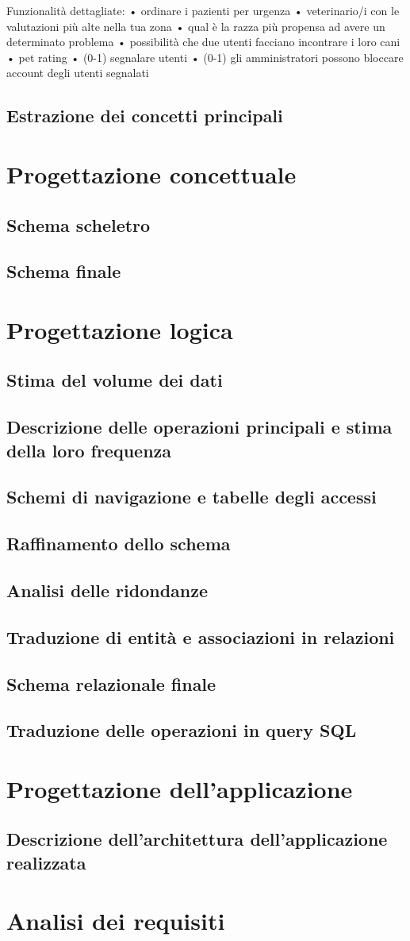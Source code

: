 \documentclass[a4paper,12pt]{report}
\begin{document}
Funzionalità dettagliate: 
•	ordinare i pazienti per urgenza
•	veterinario/i con le valutazioni più alte nella tua zona
•	qual è la razza più propensa ad avere un determinato problema
•	possibilità che due utenti facciano incontrare i loro cani
•	pet rating
•	(0-1) segnalare utenti
•	(0-1) gli amministratori possono bloccare account degli utenti segnalati 

\section{Estrazione dei concetti principali}
\newpage
\chapter{Progettazione concettuale}
\section{Schema scheletro}
\section{Schema finale}
\newpage
\chapter{Progettazione logica}
\section{Stima del volume dei dati}
\section{Descrizione delle operazioni principali e stima della loro frequenza}
\section{Schemi di navigazione e tabelle degli accessi}
\section{Raffinamento dello schema}
\section{Analisi delle ridondanze}
\section{Traduzione di entità e associazioni in relazioni}
\section{Schema relazionale finale}
\section{Traduzione delle operazioni in query SQL}
\newpage
\chapter{Progettazione dell'applicazione}
\section{Descrizione dell'architettura dell'applicazione realizzata}
\newpage
\chapter{Analisi dei requisiti}
\end{document}
